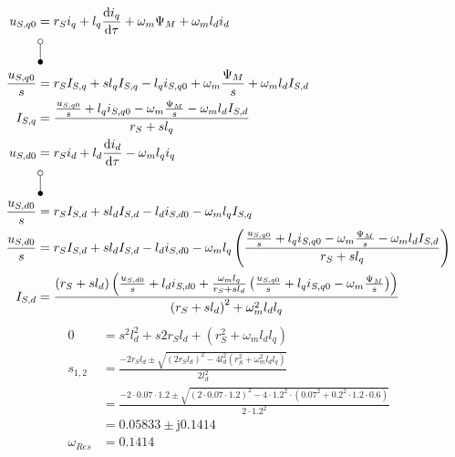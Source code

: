 \documentclass[11pt,a4paper]{scrartcl}
\newcommand{\mybr}[1]{\left(#1\right)}
\renewcommand{\j}{\mathrm{j}}
\newcommand{\0}{_{\mybr{0}}}
\newcommand{\1}{_{\mybr{1}}}
\newcommand{\2}{_{\mybr{2}}}
\renewcommand{\d}{\mathrm{d}}
\begin{document}
\subsection{}
\begin{align}
u_{S,q0}&=r_S i_q+l_q\frac{\d i_q}{\d\tau}+\omega_m \Psi_M +\omega_m l_d i_d\\
&\rotatebox[origin=c]{270}{\laplace}\nonumber\\
\frac{u_{S,q0}}{s}&=r_S I_{S,q}+s l_q I_{S,q}-l_q i_{S,q0}+\omega_m \frac{\Psi_M}{s}+\omega_m l_d I_{S,d}\\
I_{S,q}&=\frac{\frac{u_{S,q0}}{s}+l_q i_{S,q0}-\omega_m \frac{\Psi_M}{s}-\omega_m l_d I_{S,d}}{r_S+s l_q}\\
u_{S,d0}&=r_S i_d+l_d\frac{\d i_d}{\d\tau}-\omega_m l_q i_q\\
&\rotatebox[origin=c]{270}{\laplace}\nonumber\\
\frac{u_{S,d0}}{s}&=r_S I_{S,d}+s l_d I_{S,d}-l_d i_{S,d0}-\omega_m l_q I_{S,q}\\
\frac{u_{S,d0}}{s}&=r_S I_{S,d}+s l_d I_{S,d}-l_d i_{S,d0}-\omega_m l_q \mybr{\frac{\frac{u_{S,q0}}{s}+l_q i_{S,q0}-\omega_m \frac{\Psi_M}{s}-\omega_m l_d I_{S,d}}{r_S+s l_q}}\\
I_{S,d}&=\frac{\mybr{r_S+s l_d}\mybr{\frac{u_{S,d0}}{s}+l_d i_{S,d0}+\frac{\omega_m l_q}{r_S+s l_d}\mybr{\frac{u_{S,q0}}{s}+l_q i_{S,q0}-\omega_m\frac{\Psi_M}{s}}}}{\mybr{r_S+s l_d}^2+\omega_m^2 l_d l_q}
\end{align}
\begin{align}
0&=s^2 l_d^2+ s 2 r_S l_d + \mybr{r_S^2+\omega_m l_d l_q}\\
s_{1,2}&=\frac{-2 r_S l_d \pm \sqrt{\mybr{2 r_S l_d}^2 - 4 l_d^2\mybr{r_S^2+\omega_m^2 l_d l_q}}}{2 l_d^2}\\
&=\frac{-2\cdot\num{0.07}\cdot\num{1.2}\pm\sqrt{\mybr{2\cdot\num{0.07}\cdot\num{1.2}}^2-4\cdot\num{1.2}^2\cdot\mybr{\num{0.07}^2+\num{0.2}^2\cdot\num{1.2}\cdot\num{0.6}}}}{2\cdot\num{1.2}^2}\\
&=\num{0.05833}\pm\j\num{0.1414}\\
\omega_{Res}&=\num{0.1414}
\end{align}
\end{document}
